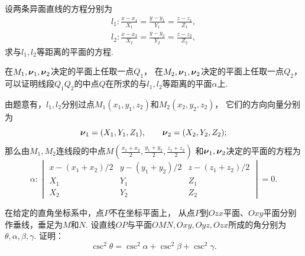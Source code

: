 \begin{example}
设两条异面直线的方程分别为\begin{gather*}
	l_1: \frac{x-x_1}{X_1} = \frac{y-y_1}{Y_1} = \frac{z-z_1}{Z_1}, \\
	l_2: \frac{x-x_2}{X_2} = \frac{y-y_2}{Y_2} = \frac{z-z_2}{Z_2},
\end{gather*}
求与\(l_1,l_2\)等距离的平面的方程.
\begin{solution}
在\(M_1,\boldsymbol{\nu}_1,\boldsymbol{\nu}_2\)决定的平面上任取一点\(Q_1\)，
在\(M_2,\boldsymbol{\nu}_1,\boldsymbol{\nu}_2\)决定的平面上任取一点\(Q_2\)，
可以证明线段\(Q_1 Q_2\)的中点\(Q\)在所求的与\(l_1,l_2\)等距离的平面\(\alpha\)上.

由题意有，\(l_1,l_2\)分别过点\(M_1(x_1,y_1,z_2)\)和\(M_2(x_2,y_2,z_2)\)，
它们的方向向量分别为\begin{equation*}
	\boldsymbol{\nu}_1 = (X_1,Y_1,Z_1), \qquad
	\boldsymbol{\nu}_2 = (X_2,Y_2,Z_2);
\end{equation*}
那么由\(M_1,M_2\)连线段的中点\(M\left(
	\frac{x_1+x_2}{2},
	\frac{y_1+y_2}{2},
	\frac{z_1+z_2}{2}
\right)\)
和\(\boldsymbol{\nu}_1,\boldsymbol{\nu}_2\)决定的平面的方程为\begin{equation*}
	\alpha: \begin{vmatrix}
		x - (x_1+x_2)/2 & y - (y_1+y_2)/2 & z - (z_1+z_2)/2 \\
		X_1 & Y_1 & Z_1 \\
		X_2 & Y_2 & Z_2
	\end{vmatrix} = 0.
\end{equation*}
\end{solution}
\end{example}

\begin{example}
在给定的直角坐标系中，点\(P\)不在坐标平面上，
从点\(P\)到\(Ozx\)平面、\(Oxy\)平面分别作垂线，垂足为\(M\)和\(N\).
设直线\(OP\)与平面\(OMN,Oxy,Oyz,Ozx\)所成的角分别为\(\theta,\alpha,\beta,\gamma\).
证明：\begin{equation*}
	\csc^2\theta = \csc^2\alpha+\csc^2\beta+\csc^2\gamma.
\end{equation*}
\end{example}
